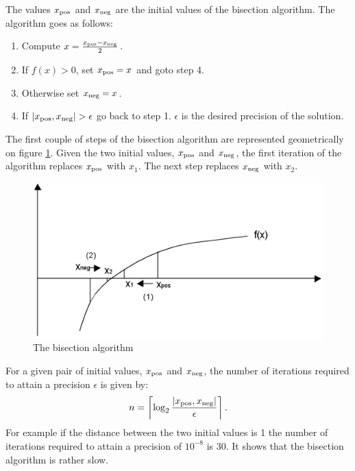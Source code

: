 \documentclass[twoside]{book}
\begin{document}
The values $x_{\mathop{\rm pos}}$ and $x_{\mathop{\rm neg}}$ are
the initial values of the bisection algorithm. The algorithm goes
as follows:
\begin{enumerate}
  \item Compute $x={x_{\mathop{\rm pos}}-x_{\mathop{\rm neg}}\over
  2}$.
  \item If $f\left(x\right)>0$, set $x_{\mathop{\rm pos}}=x$ and
  goto step 4.
  \item Otherwise set $x_{\mathop{\rm neg}}=x$.
  \item If $\left|
x_{\mathop{\rm pos}},x_{\mathop{\rm neg}}\right|>\epsilon$ go back
to step 1. $\epsilon$ is the desired precision of the solution.
\end{enumerate}
The first couple of steps of the bisection algorithm are
represented geometrically on figure \ref{fig:bisection}. Given the
two initial values, $x_{\mathop{\rm pos}}$ and $x_{\mathop{\rm
neg}}$, the first iteration of the algorithm replaces
$x_{\mathop{\rm pos}}$ with $x_1$. The next step replaces
$x_{\mathop{\rm neg}}$ with $x_2$.
\begin{figure}
\centering\includegraphics[width=12cm]{Figures/BissectionGraph}
\caption{The bisection algorithm}\label{fig:bisection}
\end{figure}

For a given pair of initial values, $x_{\mathop{\rm pos}}$ and
$x_{\mathop{\rm neg}}$, the number of iterations required to
attain a precision $\epsilon$ is given by:
\begin{equation}
\label{eq:bissectime}
  n=\left\lceil\log_2{\displaystyle\left|
x_{\mathop{\rm pos}},x_{\mathop{\rm neg}}\right| \over
\displaystyle\epsilon}\right\rceil.
\end{equation}
For example if the distance between the two initial values is 1
the number of iterations required to attain a precision of
$10^{-8}$ is 30. It shows that the bisection algorithm is rather
slow.
\end{document}
